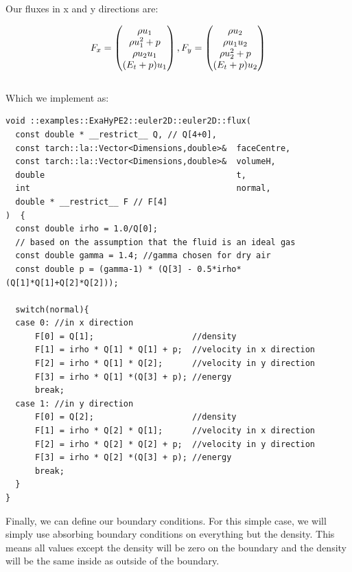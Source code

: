 \documentclass[12pt,letterpaper]{article}
\begin{document}
Our fluxes in x and y directions are:

\begin{equation*}
    F_x = \begin{pmatrix}
                      \rho u_1      \\
                      \rho u_1^2 + p\\
                      \rho u_2 u_1  \\
                      (E_t + p) u_1 
    \end{pmatrix}, \hspace{\fill} 
    F_y =\begin{pmatrix}
                      \rho u_2\\
                      \rho u_1 u_2 \\
                      \rho u_2^2 + p \\
                      (E_t + p) u_2
    \end{pmatrix}
\end{equation*}\\

Which we implement as:

\begin{lstlisting}[style = C++]
void ::examples::ExaHyPE2::euler2D::euler2D::flux(
  const double * __restrict__ Q, // Q[4+0],
  const tarch::la::Vector<Dimensions,double>&  faceCentre,
  const tarch::la::Vector<Dimensions,double>&  volumeH,
  double                                       t,
  int                                          normal,
  double * __restrict__ F // F[4]
)  {
  const double irho = 1.0/Q[0];
  // based on the assumption that the fluid is an ideal gas
  const double gamma = 1.4; //gamma chosen for dry air
  const double p = (gamma-1) * (Q[3] - 0.5*irho*(Q[1]*Q[1]+Q[2]*Q[2]));
  
  switch(normal){  
  case 0: //in x direction
	  F[0] = Q[1];                    //density
	  F[1] = irho * Q[1] * Q[1] + p;  //velocity in x direction 
	  F[2] = irho * Q[1] * Q[2];      //velocity in y direction
	  F[3] = irho * Q[1] *(Q[3] + p); //energy
	  break;
  case 1: //in y direction
	  F[0] = Q[2];                    //density
	  F[1] = irho * Q[2] * Q[1];      //velocity in x direction
	  F[2] = irho * Q[2] * Q[2] + p;  //velocity in y direction
	  F[3] = irho * Q[2] *(Q[3] + p); //energy
	  break;
  }  
}
\end{lstlisting}

\newpage

Finally, we can define our boundary conditions. For this simple case, we will simply use absorbing boundary conditions on everything but the density. This means all values except the density will be zero on the boundary and the density will be the same inside as outside of the boundary.\\ \\
\end{document}

